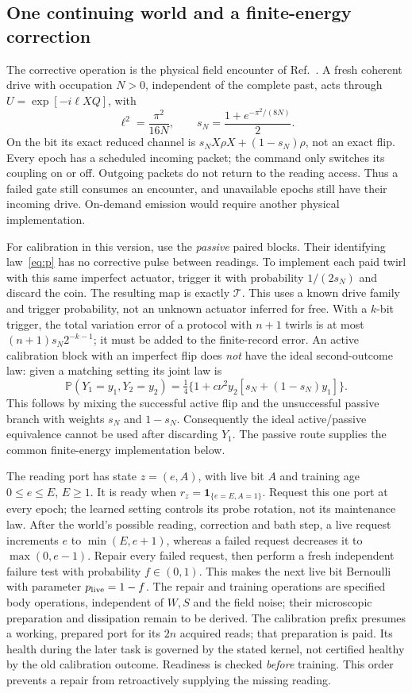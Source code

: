 \documentclass[11pt,a4paper]{article}
\newcommand{\Prb}{\mathbb P}
\begin{document}
\subsection{One continuing world and a finite-energy correction}

The corrective operation is the physical field encounter of
Ref.~\cite{QRAIFB}. A fresh coherent drive with occupation $N>0$,
independent of the complete past, acts through
$U=\exp[-i\ell XQ]$, with
\[
 \ell^2=\frac{\pi^2}{16N},\qquad
 s_N=\frac{1+e^{-\pi^2/(8N)}}2.
\]
On the bit its exact reduced channel is
$s_NX\rho X+(1-s_N)\rho$, not an exact flip.
Every epoch has a scheduled incoming packet; the command only
switches its coupling on or off. Outgoing packets do not return to
the reading access. Thus a failed gate still consumes an encounter,
and unavailable epochs still have their incoming drive. On-demand
emission would require another physical implementation.

For calibration in this version, use the \emph{passive} paired blocks.
Their identifying law~\eqref{eq:p} has no corrective pulse between
readings. To implement each paid twirl with this same imperfect
actuator, trigger it with probability $1/(2s_N)$ and discard the coin.
The resulting map is exactly $\mathcal T$. This uses a known drive
family and trigger probability, not an unknown actuator inferred for
free. With a $k$-bit trigger, the total variation error of a protocol
with $n+1$ twirls is at most $(n+1)s_N2^{-k-1}$; it must be added to
the finite-record error. An active calibration block with an
imperfect flip does \emph{not} have the ideal second-outcome law:
given a matching setting its joint law is
\[
 \Prb(Y_1=y_1,Y_2=y_2)
 =\tfrac14\{1+c\nu^2y_2[s_N+(1-s_N)y_1]\}.
\]
This follows by mixing the successful active flip and the
unsuccessful passive branch with weights $s_N$ and $1-s_N$.
Consequently the ideal active/passive equivalence cannot be used
after discarding $Y_1$. The passive route supplies the common
finite-energy implementation below.

The reading port has state $z=(e,A)$, with live bit $A$ and training
age $0\le e\le E$, $E\ge1$. It is ready when
$r_z=\mathbf1_{\{e=E,A=1\}}$. Request this one port at every epoch;
the learned setting controls its probe rotation, not its maintenance
law. After the world's possible reading, correction and bath step,
a live request increments $e$ to $\min(E,e+1)$, whereas a failed
request decreases it to $\max(0,e-1)$. Repair every failed request,
then perform a fresh independent failure test with probability
$f\in(0,1)$. This makes the next live bit Bernoulli with parameter
$p_{\rm live}=1-f$. The repair and training operations are specified
body operations, independent of $W,S$ and the field noise; their
microscopic preparation and dissipation remain to be derived.
The calibration prefix presumes a working, prepared port for its
$2n$ acquired reads; that preparation is paid. Its health during the
later task is governed by the stated kernel, not certified healthy
by the old calibration outcome.
Readiness is checked \emph{before} training. This order prevents a
repair from retroactively supplying the missing reading.
\end{document}
